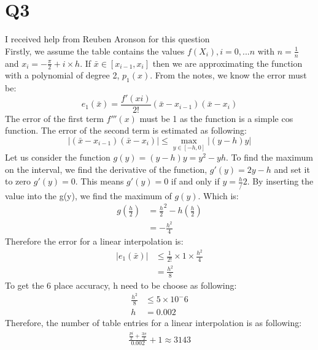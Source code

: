 \documentclass{article}
\begin{document}
\section{Q3}
I received help from Reuben Aronson for this question\\
Firstly, we assume the table contains the values $f(X_i),i = 0,...n$ with $n=\frac{1}{n}$ and $x_i = -\frac{\pi}{2} + i\times h$.  If $\bar{x} \in [x_{i-1}, x_i]$ then we are approximating the function with a polynomial of degree 2, $p_1(x)$. From the notes, we know the error must be:
\begin{equation*}
e_1(\bar{x}) = \frac{f'(xi)}{2!}(\bar{x} - x_{i-1})(\bar{x} - x_i)
\end{equation*}
The error of the first term $f'''(x)$ must be 1 as the function is a simple cos function. The error of the second term is estimated as following:
\begin{equation*}
|(\bar{x} - x_{i-1})(\bar{x} - x_i)| \leq \max_{y \in [-h, 0]}|(y-h)y|
\end{equation*}
Let us consider the function $g(y) = (y-h)y = y^2 - yh$. To find the maximum on the interval, we find the derivative of the function, $g'(y) = 2y - h$ and set it to zero $g'(y) = 0$. This means $g'(y) = 0$ if and only if $y = \frac{h}/2$. By inserting the value into the g(y), we find the maximum of $g(y)$. Which is:
\begin{equation*}
\begin{aligned}
g(\frac{h}{2}) &= {\frac{h}{2}}^2 - h(\frac{h}{2})\\
	&= -\frac{h^2}{4}
\end{aligned}
\end{equation*}
Therefore the error for a linear interpolation is:
\begin{equation*}
\begin{aligned}
|e_1(\bar{x})| &\leq \frac{1}{2!} \times 1 \times \frac{h^2}{4}\\
&= \frac{h^2}{8}
\end{aligned}
\end{equation*}
To get the 6 place accuracy, h need to be choose as following:
\begin{equation*}
\begin{aligned}
\frac{h^2}{8} &\leq 5 \times 10^-6\\
	h &= 0.002	
\end{aligned}
\end{equation*}
Therefore, the number of table entries for a linear interpolation is as following:
\begin{equation*}
\begin{aligned}
\frac{\frac{pi}{2} + \frac{3\pi}{2}}{0.002} + 1 \approx 3143
\end{aligned}
\end{equation*}
\end{document}
